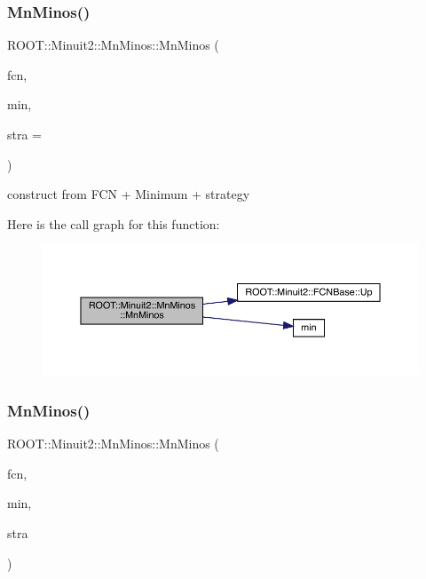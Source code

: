 \subsubsection{\texorpdfstring{MnMinos()}{MnMinos()}\hspace{0.1cm}{\footnotesize\ttfamily [1/6]}}
{\footnotesize\ttfamily R\+O\+O\+T\+::\+Minuit2\+::\+Mn\+Minos\+::\+Mn\+Minos (\begin{DoxyParamCaption}\item[{const \mbox{\hyperlink{classROOT_1_1Minuit2_1_1FCNBase}{F\+C\+N\+Base}} \&}]{fcn,  }\item[{const \mbox{\hyperlink{classROOT_1_1Minuit2_1_1FunctionMinimum}{Function\+Minimum}} \&}]{min,  }\item[{unsigned int}]{stra = {} }\end{DoxyParamCaption})}



construct from F\+CN + Minimum + strategy 

Here is the call graph for this function\+:
\nopagebreak
\begin{figure}[H]
\begin{center}
\leavevmode
\includegraphics[width=350pt]{dc/d91/classROOT_1_1Minuit2_1_1MnMinos_ac64ec75423efa6e473ee722f08f47eb4_cgraph}
\end{center}
\end{figure}
\mbox{\label{classROOT_1_1Minuit2_1_1MnMinos_a80f912ade0dd48d937bc04b14e28623c}} 
\subsubsection{\texorpdfstring{MnMinos()}{MnMinos()}\hspace{0.1cm}{\footnotesize\ttfamily [2/6]}}
{\footnotesize\ttfamily R\+O\+O\+T\+::\+Minuit2\+::\+Mn\+Minos\+::\+Mn\+Minos (\begin{DoxyParamCaption}\item[{const \mbox{\hyperlink{classROOT_1_1Minuit2_1_1FCNBase}{F\+C\+N\+Base}} \&}]{fcn,  }\item[{const \mbox{\hyperlink{classROOT_1_1Minuit2_1_1FunctionMinimum}{Function\+Minimum}} \&}]{min,  }\item[{const \mbox{\hyperlink{classROOT_1_1Minuit2_1_1MnStrategy}{Mn\+Strategy}} \&}]{stra }\end{DoxyParamCaption})}



